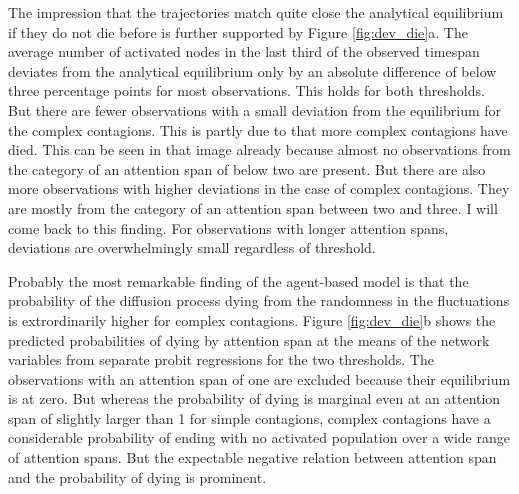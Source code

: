 \documentclass[a4paper,12pt]{article}
\begin{document}
The impression that the trajectories match quite close the analytical equilibrium if they do not die before is further supported by Figure \ref{fig:dev_die}a. The average number of activated nodes in the last third of the observed timespan deviates from the analytical equilibrium only by an absolute difference of below three percentage points for most observations. This holds for both thresholds. But there are fewer observations with a small deviation from the equilibrium for the complex contagions. This is partly due to that more complex contagions have died. This can be seen in that image already because almost no observations from the category of an attention span of below two are present. But there are also more observations with higher deviations in the case of complex contagions. They are mostly from the category of an attention span between two and three. I will come back to this finding. For observations with longer attention spans, deviations are overwhelmingly small regardless of threshold.

Probably the most remarkable finding of the agent-based model is that the probability of the diffusion process dying from the randomness in the fluctuations is extrordinarily higher for complex contagions. Figure \ref{fig:dev_die}b shows the predicted probabilities of dying by attention span at the means of the network variables from separate probit regressions for the two thresholds. The observations with an attention span of one are excluded because their equilibrium is at zero. But whereas the probability of dying is marginal even at an attention span of slightly larger than 1 for simple contagions, complex contagions have a considerable probability of ending with no activated population over a wide range of attention spans. But the expectable negative relation between attention span and the probability of dying is prominent.
\end{document}
